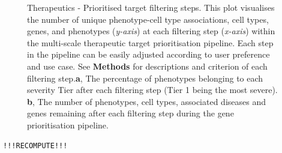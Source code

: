\documentclass[
sn-nature
]{sn-jnl}
\begin{document}
\label{cell-fig-therapy-filter}
\begin{figure}[H]


\caption{\label{fig-therapy-filter}Therapeutics - Prioritised target
filtering steps. This plot visualises the number of unique
phenotype-cell type associations, cell types, genes, and phenotypes
(\emph{y-axis}) at each filtering step (\emph{x-axis}) within the
multi-scale therapeutic target prioritisation pipeline. Each step in the
pipeline can be easily adjusted according to user preference and use
case. See \textbf{Methods} for descriptions and criterion of each
filtering step.\textbf{a}, The percentage of phenotypes belonging to
each severity Tier after each filtering step (Tier 1 being the most
severe). \textbf{b}, The number of phenotypes, cell types, associated
diseases and genes remaining after each filtering step during the gene
prioritisation pipeline.}

\end{figure}%

\label{cell-fig-monarch-recall}
\begin{verbatim}
!!!RECOMPUTE!!!
\end{verbatim}
\end{document}
